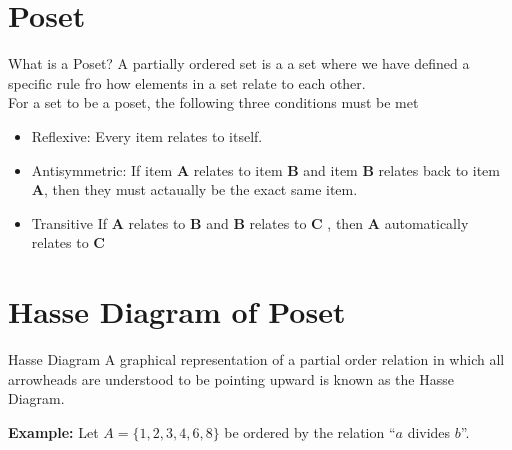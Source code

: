 \documentclass{beamer}
\begin{document}
\section{Poset}
\begin{frame}{What is a Poset?}
A partially ordered set is a a set where we have defined a specific rule fro how elements in a set relate to each other.\\
\vspace{1 ex}
For a set to be a poset, the following three conditions must be met 
\begin{itemize}
    \item Reflexive: Every item relates to itself.
    \item Antisymmetric: If item $\mathbf{A}$ relates to item $\mathbf{B}$ and item $\mathbf{B}$ relates back to item $\mathbf{A}$, then they must actaually be the exact same item.
    \item Transitive If $\mathbf{A}$ relates to $\mathbf{B}$ and $\mathbf{B}$  relates to $\mathbf{C}$ , then $\mathbf{A}$ automatically relates to $\mathbf{C}$ 
\end{itemize}

    
\end{frame}

\section{Hasse Diagram of Poset}
\begin{frame}{Hasse Diagram}
A graphical representation of a partial order relation in which all arrowheads are understood to be pointing upward is known as the Hasse Diagram.

\vspace{0.5cm}

\textbf{Example:} Let $A = \{1, 2, 3, 4, 6, 8\}$ be ordered by the relation ``$a$ divides $b$''.

\begin{center}
\end{center}
\end{frame}
\end{document}
